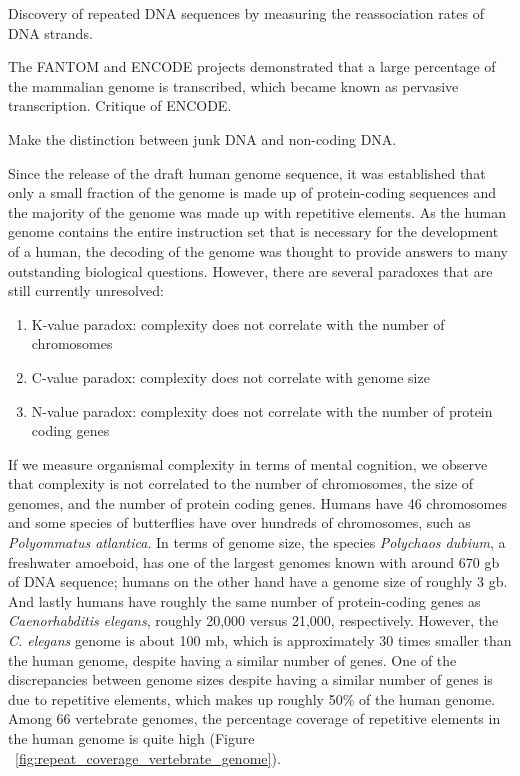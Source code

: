 Discovery of repeated DNA sequences\cite{Britten1968} by measuring the reassociation rates of DNA strands.

The FANTOM and ENCODE projects demonstrated that a large percentage of the mammalian genome is transcribed, which became known as pervasive transcription\cite{pmid21765801}. Critique of ENCODE\cite{pmid23431001, pmid23479647, pmid23137679}.

Make the distinction between junk DNA and non-coding DNA.

Since the release of the draft human genome sequence\cite{venter2001sequence, lander2001initial}, it was established that only a small fraction of the genome is made up of protein-coding sequences and the majority of the genome was made up with repetitive elements. As the human genome contains the entire instruction set that is necessary for the development of a human, the decoding of the genome was thought to provide answers to many outstanding biological questions. However, there are several paradoxes that are still currently unresolved:

\begin{enumerate}
   \item K-value paradox: complexity does not correlate with the number of chromosomes
   \item C-value paradox: complexity does not correlate with genome size
   \item N-value paradox: complexity does not correlate with the number of protein coding genes
\end{enumerate}

If we measure organismal complexity in terms of mental cognition, we observe that complexity is not correlated to the number of chromosomes, the size of genomes, and the number of protein coding genes. Humans have 46 chromosomes and some species of butterflies have over hundreds of chromosomes, such as \textit{Polyommatus atlantica}. In terms of genome size, the species \textit{Polychaos dubium}, a freshwater amoeboid, has one of the largest genomes known with around 670 gb of DNA sequence; humans on the other hand have a genome size of roughly 3 gb. And lastly humans have roughly the same number of protein-coding genes as \textit{Caenorhabditis elegans}, roughly 20,000 versus 21,000, respectively. However, the \textit{C. elegans} genome is about 100 mb\cite{celegans1998sequencing}, which is approximately 30 times smaller than the human genome, despite having a similar number of genes. One of the discrepancies between genome sizes despite having a similar number of genes is due to repetitive elements, which makes up roughly 50\% of the human genome. Among 66 vertebrate genomes, the percentage coverage of repetitive elements in the human genome is quite high (Figure ~\ref{fig:repeat_coverage_vertebrate_genome}).

